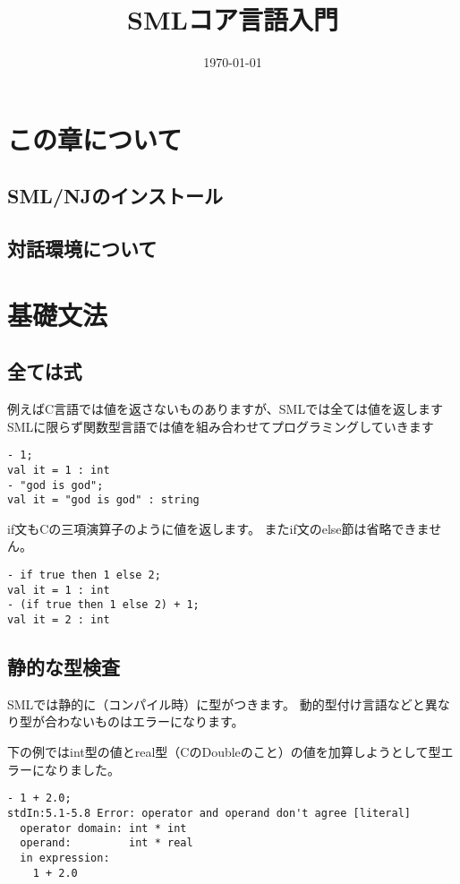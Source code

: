 \documentclass[11pt]{article}
\date{\today}
\title{SMLコア言語入門}
\begin{document}
\maketitle
\tableofcontents


\section{この章について}
\label{sec-1}
\subsection{SML/NJのインストール}
\label{sec-1-1}
\subsection{対話環境について}
\label{sec-1-2}

\section{基礎文法}
\label{sec-2}
\subsection{全ては式}
\label{sec-2-1}
例えばC言語では値を返さないものありますが、SMLでは全ては値を返します
SMLに限らず関数型言語では値を組み合わせてプログラミングしていきます
\begin{verbatim}
- 1;
val it = 1 : int
- "god is god";
val it = "god is god" : string
\end{verbatim}

if文もCの三項演算子のように値を返します。
またif文のelse節は省略できません。
\begin{verbatim}
- if true then 1 else 2;
val it = 1 : int
- (if true then 1 else 2) + 1;
val it = 2 : int
\end{verbatim}


\subsection{静的な型検査}
\label{sec-2-2}
SMLでは静的に（コンパイル時）に型がつきます。
動的型付け言語などと異なり型が合わないものはエラーになります。

下の例ではint型の値とreal型（CのDoubleのこと）の値を加算しようとして型エラーになりました。
\begin{verbatim}
- 1 + 2.0;
stdIn:5.1-5.8 Error: operator and operand don't agree [literal]
  operator domain: int * int
  operand:         int * real
  in expression:
    1 + 2.0
\end{verbatim}
\end{document}
